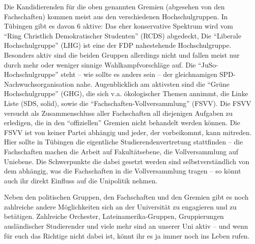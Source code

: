 Die Kandidierenden für die oben genannten Gremien (abgesehen von den
  Fachschaften) kommen meist aus den verschiedenen Hochschulgruppen.  In
  Tübingen gibt es davon 6  aktive: Das eher konservative Spektrum wird vom
"`Ring Christlich Demokratischer Studenten"' (RCDS) abgedeckt,
  Die
  "`Liberale Hochschulgruppe"' (LHG) ist eine der FDP nahestehende
  Hochschulgruppe. %
  Besonders aktiv sind die beiden Gruppen allerdings nicht und fallen
meist nur durch mehr oder weniger sinnige Wahlkampfvorschläge auf. Die
  "`JuSo-Hochschulgruppe"'
  steht -- wie sollte es anders sein -- der gleichnamigen
  SPD-Nachwuchsorganisation nahe.
  Augenblicklich am aktivsten sind die "`Grüne Hochschulgruppe"' (GHG),
  die sich v.a. ökologischer Themen annimmt, die Linke Liste (SDS, solid),
  sowie die "`Fachschaften-Vollversammlung"' (FSVV).
  Die FSVV versucht als Zusammenschluss
  aller Fachschaften all diejenigen Aufgaben zu erledigen, die in
  den "`offiziellen"' Gremien nicht behandelt werden können.  Die FSVV ist
  von keiner Partei abhängig und jeder, der vorbeikommt, kann mitreden.
  Hier sollte in Tübingen die eigentliche Studierendenvertretung stattfinden --
  die Fachschaften machen die Arbeit auf Fakultätsebene, die
  Vollversammlung auf Uniebene. Die Schwerpunkte die dabei gesetzt werden
sind selbstverständlich von dem abhängig, was die Fachschaften in die
Vollversammlung tragen -- so könnt auch ihr direkt Einfluss auf die
Unipolitik nehmen.



%

Neben den politischen Gruppen, den Fachschaften und den Gremien gibt es
noch zahlreiche andere Möglichkeiten sich an der Universität zu
engagieren und zu betätigen. Zahlreiche Orchester, Lateinamerika-Gruppen,
Gruppierungen ausländischer Studierender und viele mehr sind an
unserer Uni aktiv -- und wenn für euch das Richtige nicht dabei ist,
könnt ihr es ja immer noch ins Leben rufen.
\vspace{2cm}
